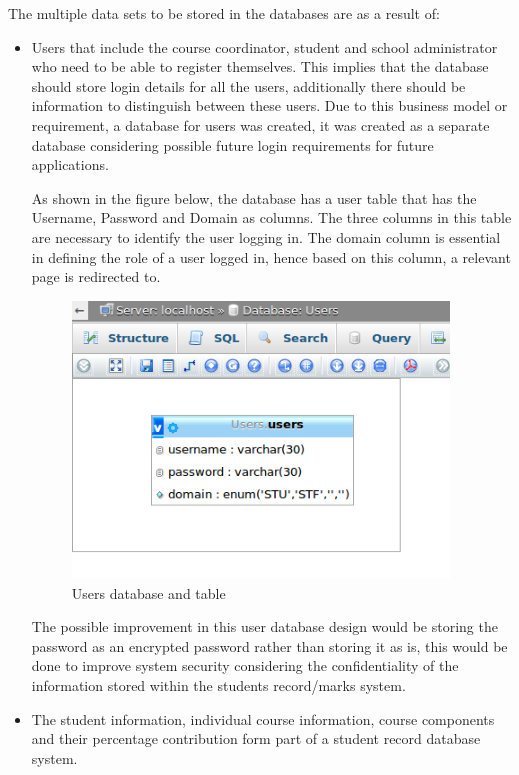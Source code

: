 The multiple data sets to be stored in the databases are as a result of:
\begin{itemize}
\item Users that include the course coordinator, student and school administrator who need to be able to register themselves. This implies that the database should store login details for all the users, additionally there should be information to distinguish between these users. Due to this business model or requirement, a database for users was created, it was created as a separate database considering possible future login requirements for future applications.

As shown in the figure below, the database has a user table that has the Username, Password and Domain as columns. The three columns in this table are necessary to identify the user logging in. The domain column is essential in defining the role of a user logged in, hence based on this column, a relevant page is redirected to.
\clearpage
\begin{center}
\begin{figure}[h]
\centering
\includegraphics[width=10cm]{Users}
\caption{Users database and table }
\end{figure}
\end{center}

The possible improvement in this user database design would be storing the password as an encrypted password rather than storing it as is, this would be done to improve system security considering the confidentiality of the information stored within the students record/marks system.  
 
\item The student information, individual course information, course components and their percentage contribution form part of a student record database system. 


\end{itemize}
